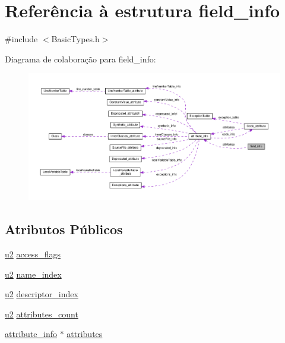 \hypertarget{structfield__info}{}\section{Referência à estrutura field\+\_\+info}
\label{structfield__info}


{\ttfamily \#include $<$Basic\+Types.\+h$>$}



Diagrama de colaboração para field\+\_\+info\+:\nopagebreak
\begin{figure}[H]
\begin{center}
\leavevmode
\includegraphics[width=350pt]{structfield__info__coll__graph}
\end{center}
\end{figure}
\subsection*{Atributos Públicos}
\begin{DoxyCompactItemize}
\item 
\hyperlink{BasicTypes_8h_a732cde1300aafb73b0ea6c2558a7a54f}{u2} \hyperlink{structfield__info_aa622dc9a5b5353d2f3eb2f416dacab4b}{access\+\_\+flags}
\item 
\hyperlink{BasicTypes_8h_a732cde1300aafb73b0ea6c2558a7a54f}{u2} \hyperlink{structfield__info_a425e3ae85badd81c67ef00acca85ad9e}{name\+\_\+index}
\item 
\hyperlink{BasicTypes_8h_a732cde1300aafb73b0ea6c2558a7a54f}{u2} \hyperlink{structfield__info_a12dd492b7fb1d61da1ac14938d97b07f}{descriptor\+\_\+index}
\item 
\hyperlink{BasicTypes_8h_a732cde1300aafb73b0ea6c2558a7a54f}{u2} \hyperlink{structfield__info_a83bfa4ff84a608e3dbd1c3968ebe1b80}{attributes\+\_\+count}
\item 
\hyperlink{structattribute__info}{attribute\+\_\+info} $\ast$ \hyperlink{structfield__info_afdda114944ae5eaae78c237f99257108}{attributes}
\end{DoxyCompactItemize}


